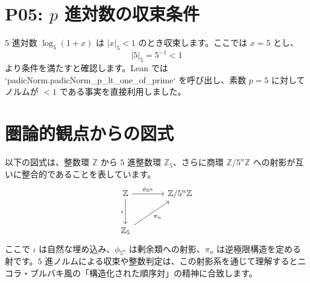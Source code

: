 \documentclass[12pt]{ltjsarticle}
\begin{document}
\section{P05: $p$ 進対数の収束条件}
$5$ 進対数 $\log_5(1+x)$ は $\lvert x \rvert_5 < 1$ のとき収束します。ここでは $x = 5$ とし、
\[
  \lvert 5 \rvert_5 = 5^{-1} < 1
\]
より条件を満たすと確認します。Lean では `padicNorm.padicNorm_p_lt_one_of_prime` を呼び出し、素数 $p=5$ に対してノルムが $<1$ である事実を直接利用しました。

\section*{圏論的観点からの図式}
以下の図式は、整数環 $\mathbb{Z}$ から $5$ 進整数環 $\mathbb{Z}_5$、さらに商環 $\mathbb{Z}/5^n\mathbb{Z}$ への射影が互いに整合的であることを表しています。
\[
\begin{tikzcd}[row sep=large, column sep=large]
\mathbb{Z} \arrow[r, "\phi_{5^n}"] \arrow[d, "\iota"'] & \mathbb{Z}/5^n\mathbb{Z} \\
\mathbb{Z}_5 \arrow[ur, "\pi_n"'] &
\end{tikzcd}
\]
ここで $\iota$ は自然な埋め込み、$\phi_{5^n}$ は剰余類への射影、$\pi_n$ は逆極限構造を定める射です。$5$ 進ノルムによる収束や整数判定は、この射影系を通じて理解するとニコラ・ブルバキ風の「構造化された順序対」の精神に合致します。
\end{document}
